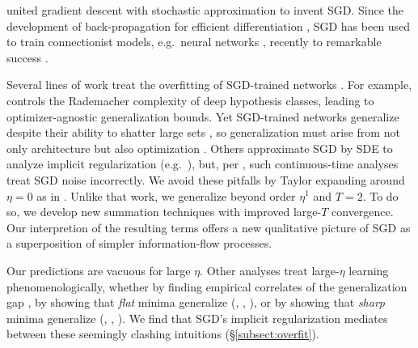 \documentclass[anon,12pt]{colt2021} %
\begin{document}
            \cite{ki52} united gradient descent \citep{ca47}
            with stochastic approximation \citep{ro51} to invent SGD.  Since
            the development of back-propagation for efficient differentiation
            \citep{we74}, SGD has been used to train connectionist models,
            e.g.\ neural networks \citep{bo91}, recently to remarkable success
            \citep{le15}.
        
        
            Several lines of work treat the overfitting of SGD-trained networks
            \citep{ne17a}.  For example, \cite{ba17} controls the Rademacher
            complexity of deep hypothesis classes, leading to
            optimizer-agnostic generalization bounds.  Yet SGD-trained networks
            generalize despite their ability to shatter large sets
            \citep{zh17}, so generalization must arise from not only
            architecture but also optimization \citep{ne17b}.  Others
            approximate SGD by SDE to analyze implicit regularization (e.g.\
            \cite{ch18}), but, per \cite{ya19a}, such continuous-time analyses
            treat SGD noise incorrectly.
            We avoid these pitfalls by Taylor expanding around $\eta=0$ as in
            \cite{ro18}.  Unlike that work, we generalize beyond order $\eta^1$
            and $T=2$.  To do so, we develop new summation techniques with
            improved large-$T$ convergence.  Our interpretion of the resulting
            terms offers a new qualitative picture of SGD as a superposition of
            simpler information-flow processes.
            
        
            Our predictions are vacuous for large $\eta$.  Other analyses treat
            large-$\eta$ learning phenomenologically, whether by finding
            empirical correlates of the generalization gap \citep{li18}, by
            showing that \emph{flat} minima generalize (\cite{ho17},
            \cite{ke17}, \cite{wa18}), or by showing that \emph{sharp} minima
            generalize (\cite{st56}, \cite{di17}, \cite{wu18}).  We find that
            SGD's implicit regularization mediates between these seemingly
            clashing intuitions (\S \ref{subsect:overfit}).
            
\end{document}
